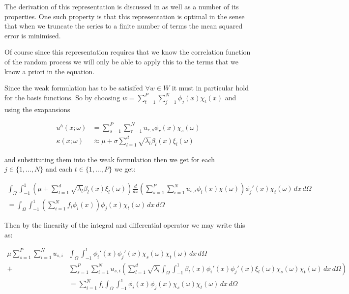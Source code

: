 The derivation of this representation is discussed in \cite{stochastic-fem} as
well as a number of its properties. One such property is that this
representation is optimal in the sense that when we truncate the series to a
finite number of terms the mean squared error is minimised.

Of course since this representation requires that we know the correlation
function of the random process we will only be able to apply this to the terms
that we know a priori in the equation.

Since the weak formulation  has to be satisifed
$\forall w \in W$ it must in particular hold for the basis functions. So by
choosing $w = \sum_{t=1}^P\sum_{j=1}^N\phi_j(x)\chi_t(x)$ and using the
exapansions

\begin{align}
    u^h(x;\omega) &= \sum_{s=1}^P\sum_{r=1}^Nu_{r,s}\phi_r(x)\chi_s(\omega) \\
    \kappa(x;\omega) &\approx \mu + \sigma\sum_{l=1}^d\sqrt{\lambda_l}\beta_l(x)\xi_l(\omega)
\end{align}

and substituting them into the weak formulation then we get for each $j \in
\{1,\ldots,N\}$ and each $t \in \{1,\ldots,P\}$ we get:

\begin{align*}
    \int_{\Omega}\int_{-1}^1
      \left(\mu + \sum_{l=1}^d\sqrt{\lambda_l}\beta_l(x)\xi_l(\omega)\right)
      \frac{d}{dx}\left(\sum_{s=1}^P\sum_{i=1}^Nu_{s,i}\phi_i(x)\chi(\omega)\right)
      \phi_j'(x)\chi_t(\omega)\, dx\, d\Omega \\ =
    \int_{\Omega}\int_{-1}^1
      \left(\sum_{i=1}^Nf_i\phi_i(x)\right)
      \phi_j(x)\chi_t(\omega)\, dx\, d\Omega
\end{align*}

Then by the linearity of the integral and differential operator we may write
this as:

\begin{align*}
    \mu\sum_{s=1}^P\sum_{i=1}^Nu_{s,i}&\int_\Omega\int_{-1}^1
      \phi_i'(x)\phi_j'(x)\chi_s(\omega)\chi_t(\omega)\, dx\, d\Omega \\+
    &\sum_{s=1}^P\sum_{i=1}^Nu_{s,i}
      \left(\sum_{l=1}^d\sqrt{\lambda_l}
        \int_\Omega\int_{-1}^1\beta_l(x)\phi_i'(x)\phi_j'(x)
        \xi_l(\omega)\chi_s(\omega)\chi_t(\omega)\, dx\, d\Omega\right) \\
     &= \sum_{i=1}^Nf_i\int_\Omega\int_{-1}^1
      \phi_i(x)\phi_j(x)\chi_s(\omega)\chi_t(\omega)\, dx\, d\Omega
\end{align*}

